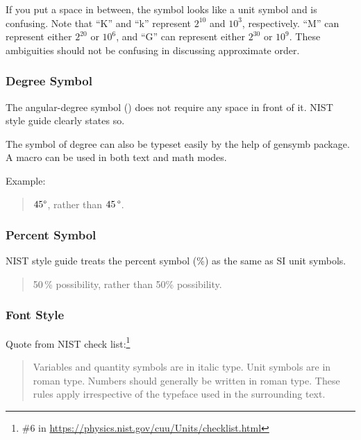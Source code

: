 If you put a space in between, the symbol looks like a unit symbol and
is confusing.
Note that ``K'' and ``k'' represent $2^{10}$ and $10^3$, respectively.
``M'' can represent either $2^{20}$ or $10^6$, and ``G'' can represent
either $2^{30}$ or $10^9$. These ambiguities should not be confusing
in discussing approximate order.

\subsubsection{Degree Symbol}
\label{sec:app:styleguide:Degree Symbol}

The angular-degree symbol (\degree) does not require any space in front
of it. NIST style guide clearly states so.

The symbol of degree can also be typeset easily by the help of gensymb
package.
A macro \qco{\\degree} can be used in both text and math modes.

Example:

\begin{quote}
  $45\degree$, rather than $45\,\degree$.
\end{quote}

\subsubsection{Percent Symbol}
\label{sec:app:styleguide:Percent Symbol}

NIST style guide treats the percent symbol (\%) as the same as SI unit
symbols.

\begin{quote}
  50\,\% possibility, rather than 50\% possibility.
\end{quote}

\subsubsection{Font Style}
\label{sec:app:styleguide:Font Style}

Quote from NIST check list:\footnote{
  \#6 in \url{https://physics.nist.gov/cuu/Units/checklist.html}
}

\begin{quote}
  Variables and quantity symbols are in italic type. Unit symbols
  are in roman type. Numbers should generally be written in roman
  type. These rules apply irrespective of the typeface used in
  the surrounding text.
\end{quote}

